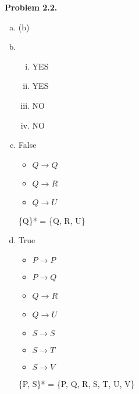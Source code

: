 \documentclass[a4paper,12pt]{article}
\newenvironment{problem}[1]{\par\bigskip\noindent\textbf{Problem #1.}
  \enskip\ignorespaces}{}
\begin{document}
  \begin{problem}{2.2}
    \begin{enumerate}[(a)]
      \item (b)
      \item
      \begin{enumerate}[i.]
        \item YES
        \item YES
        \item NO
        \item NO
      \end{enumerate}
      \item False
        \begin{itemize}
          \item $Q \rightarrow Q$
          \item $Q \rightarrow R$
          \item $Q \rightarrow U$
        \end{itemize}
        \{Q\}* = \{Q, R, U\}
      \item True
        \begin{itemize}
          \item $P \rightarrow P$
          \item $P \rightarrow Q$
          \item $Q \rightarrow R$
          \item $Q \rightarrow U$
          \item $S \rightarrow S$
          \item $S \rightarrow T$
          \item $S \rightarrow V$
        \end{itemize}
        \{P, S\}* = \{P, Q, R, S, T, U, V\}
    \end{enumerate}
  \end{problem}


\end{document}
